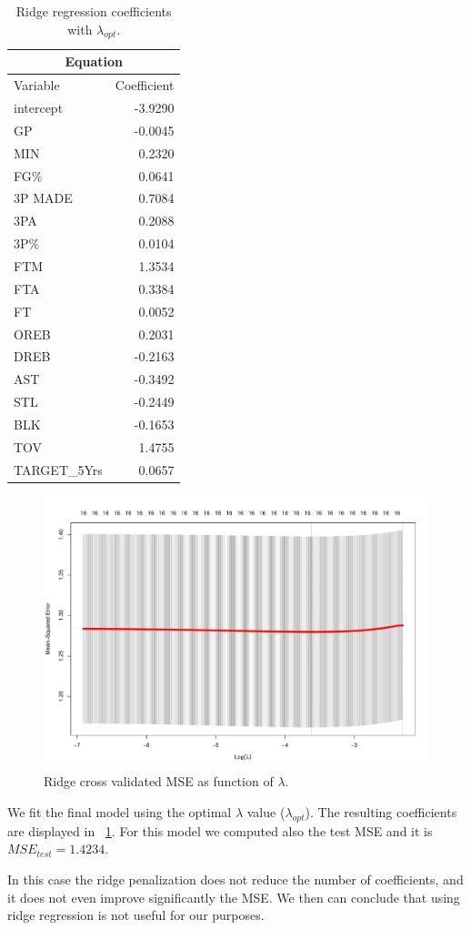\begin{table}[H]
	\centering
	\begin{tabular}{|| l | r ||} 
		\hline
		\multicolumn{2}{|c|}{Equation} \\
		\hline
		Variable & Coefficient \\
		\hline
		intercept & -3.9290 \\
		GP & -0.0045 \\
		MIN & 0.2320 \\
		FG\% & 0.0641 \\
		3P MADE & 0.7084 \\
		3PA & 0.2088 \\
		3P\% & 0.0104 \\
		FTM & 1.3534 \\
		FTA & 0.3384 \\
		FT & 0.0052 \\
		OREB & 0.2031 \\
		DREB & -0.2163 \\
		AST & -0.3492 \\			
		STL & -0.2449 \\
		BLK & -0.1653 \\
		TOV & 1.4755 \\
		TARGET\_5Yrs & 0.0657 \\				
		\hline
	\end{tabular}
	\caption{Ridge regression coefficients with $\lambda_{opt}$.}
	\label{table:FinalRidgeCoef}
\end{table}


\begin{figure}[H]
	\centering
	\includegraphics[width=0.7\linewidth]{ImageFiles/Regression/Ridge/RidgeCvPlot.pdf}
	\caption{Ridge cross validated MSE as function of $\lambda$.}
	\label{fig:RidgeCvPlot}
\end{figure}

We fit the final model using the optimal $\lambda$ value ($\lambda_{opt}$). The resulting coefficients are displayed in \Tab~\ref{table:FinalRidgeCoef}. For this model we computed also the test MSE and it is $MSE_{test} = 1.4234$.

In this case the ridge penalization does not reduce the number of coefficients, and it does not even improve significantly the MSE. We then can conclude that using ridge regression is not useful for our purposes.
